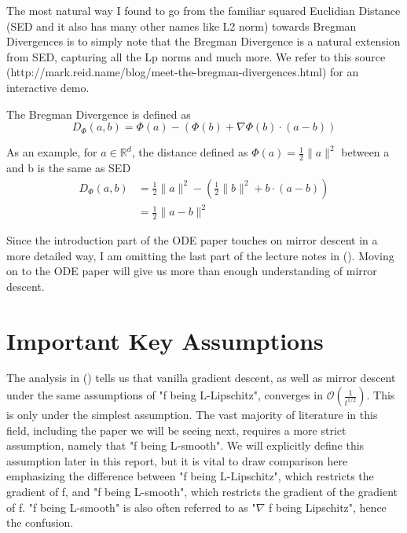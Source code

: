 \documentclass{article}
\begin{document}
The most natural way I found to go from the familiar squared Euclidian Distance (SED and it also has many other names like L2 norm) towards Bregman Divergences is to simply note that the Bregman Divergence is a natural extension from SED, capturing all the Lp norms and much more. We refer to this source (http://mark.reid.name/blog/meet-the-bregman-divergences.html) for an interactive demo.

The Bregman Divergence is defined as
\begin{equation*}
    D_{\Phi}(a, b)=\Phi(a)-(\Phi(b)+\nabla \Phi(b) \cdot(a-b))
\end{equation*}

As an example, for $a \in {\mathbb{R}^{d}}$, the distance defined as $\Phi(a) = \frac{1}{2} \|a\|^{2}$ between a and b is the same as SED
\begin{equation*}
    \begin{aligned}
    D_{\Phi}(a, b) &=\frac{1}{2}\|a\|^{2}-\left(\frac{1}{2}\|b\|^{2}+b \cdot(a-b)\right) \\
    &=\frac{1}{2}\|a-b\|^{2}
    \end{aligned}
\end{equation*}



Since the introduction part of the ODE paper touches on mirror descent in a more detailed way, I am omitting the last part of the lecture notes in (\cite{zhang2019mirror}). Moving on to the ODE paper will give us more than enough understanding of mirror descent.\\


\section{Important Key Assumptions}

The analysis in (\cite{zhang2019mirror}) tells us that vanilla gradient descent, as well as mirror descent under the same assumptions of "f being L-Lipschitz", converges in $\mathcal{O}(\frac{1}{t^{1/2}})$. This is only under the simplest assumption. The vast majority of literature in this field, including the paper we will be seeing next, requires a more strict assumption, namely that "f being L-smooth". We will explicitly define this assumption later in this report, but it is vital to draw comparison here emphasizing the difference between "f being L-Lipschitz", which restricts the gradient of f, and "f being L-smooth", which restricts the gradient of the gradient of f. "f being L-smooth" is also often referred to as "$\nabla$ f being Lipschitz", hence the confusion.
\end{document}
